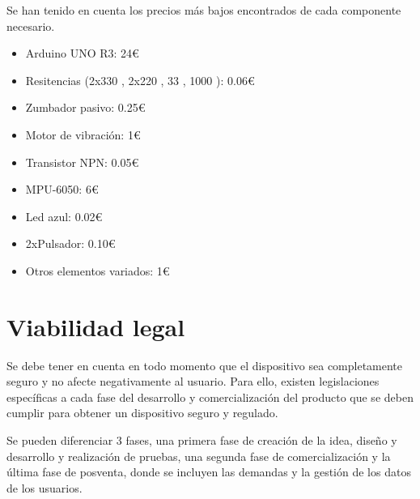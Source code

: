 Se han tenido en cuenta los precios más bajos encontrados de cada componente necesario.
\begin{itemize}
    \item Arduino UNO R3: 24€
    \item Resitencias (2x330 \textOmega, 2x220 \textOmega, 33 \textOmega, 1000 \textOmega): 0.06€
    \item Zumbador pasivo: 0.25€
    \item Motor de vibración: 1€
    \item Transistor NPN: 0.05€
    \item MPU-6050: 6€
    \item Led azul: 0.02€
    \item 2xPulsador: 0.10€
    \item Otros elementos variados: 1€
    
\end{itemize}




\section{Viabilidad legal}

Se debe tener en cuenta en todo momento que el dispositivo sea completamente seguro y no afecte negativamente al usuario. Para ello, existen legislaciones específicas a cada fase del desarrollo y comercialización del producto que se deben cumplir para obtener un dispositivo seguro y regulado.

Se pueden diferenciar 3 fases, una primera fase de creación de la idea, diseño y desarrollo y realización de pruebas, una segunda fase de comercialización y la última fase de posventa, donde se incluyen las demandas y la gestión de los datos de los usuarios.

